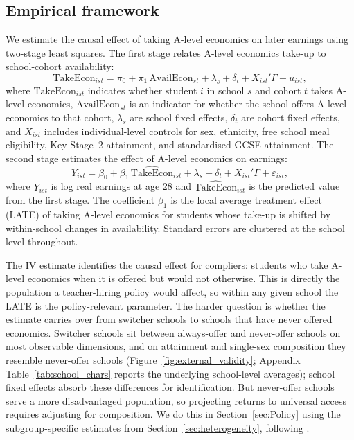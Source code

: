 \subsection{Empirical framework}
\label{sec:framework}

We estimate the causal effect of taking A-level economics on later earnings using two-stage least squares. The first stage relates A-level economics take-up to school-cohort availability:
%
\begin{equation}
\label{eq:firststage}
\text{TakeEcon}_{ist}
    = \pi_0
    + \pi_1\,\text{AvailEcon}_{st}
    + \lambda_s
    + \delta_t
    + X_{ist}'\Gamma
    + u_{ist},
\end{equation}
%
where $\text{TakeEcon}_{ist}$ indicates whether student $i$ in school $s$ and cohort $t$ takes A-level economics, $\text{AvailEcon}_{st}$ is an indicator for whether the school offers A-level economics to that cohort, $\lambda_s$ are school fixed effects, $\delta_t$ are cohort fixed effects, and $X_{ist}$ includes individual-level controls for sex, ethnicity, free school meal eligibility, Key Stage~2 attainment, and standardised GCSE attainment. The second stage estimates the effect of A-level economics on earnings:
%
\begin{equation}
\label{eq:secondstage}
Y_{ist}
    = \beta_0
    + \beta_1\,\widehat{\text{TakeEcon}}_{ist}
    + \lambda_s
    + \delta_t
    + X_{ist}'\Gamma
    + \varepsilon_{ist},
\end{equation}
%
where $Y_{ist}$ is log real earnings at age 28 and $\widehat{\text{TakeEcon}}_{ist}$ is the predicted value from the first stage. The coefficient $\beta_1$ is the local average treatment effect (LATE) of taking A-level economics for students whose take-up is shifted by within-school changes in availability. Standard errors are clustered at the school level throughout.


The IV estimate identifies the causal effect for compliers: students who take A-level economics when it is offered but would not otherwise. This is directly the population a teacher-hiring policy would affect, so within any given school the LATE is the policy-relevant parameter. The harder question is whether the estimate carries over from switcher schools to schools that have never offered economics. Switcher schools sit between always-offer and never-offer schools on most observable dimensions, and on attainment and single-sex composition they resemble never-offer schools (Figure~\ref{fig:external_validity}; Appendix Table~\ref{tab:school_chars} reports the underlying school-level averages); school fixed effects absorb these differences for identification. But never-offer schools serve a more disadvantaged population, so projecting returns to universal access requires adjusting for composition. We do this in Section~\ref{sec:Policy} using the subgroup-specific estimates from Section~\ref{sec:heterogeneity}, following \citet{angrist2013extrapolate}.

